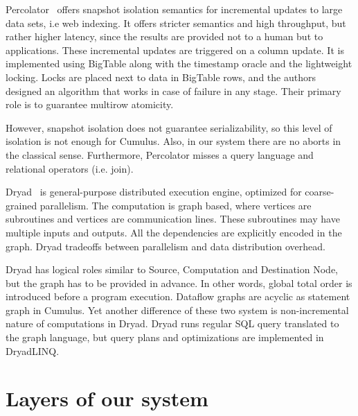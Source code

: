 \documentclass{sig-semester}
\begin{document}
Percolator~\cite{peng10} offers snapshot isolation semantics for incremental updates to large data sets, i.e web indexing. It offers stricter semantics and high throughput, but rather higher latency, since the results are provided not to a human but to applications. These incremental updates are triggered on a column update. It is implemented using BigTable along with the timestamp oracle and the lightweight locking. Locks are placed next to data in BigTable rows, and the authors designed an algorithm that works in case of failure in any stage. Their primary role is to guarantee multirow atomicity.

However, snapshot isolation does not guarantee serializability, so this level of isolation is not enough for Cumulus. Also, in our system there are no aborts in the classical sense. Furthermore, Percolator misses a query language and relational operators (i.e. join).

Dryad~\cite{isard07} is general-purpose distributed execution engine, optimized for coarse-grained parallelism. The computation is graph based, where vertices are subroutines and vertices are communication lines. These subroutines may have multiple inputs and outputs. All the dependencies are explicitly encoded in the graph. Dryad tradeoffs between parallelism and data distribution overhead.

Dryad has logical roles similar to Source, Computation and Destination Node, but the graph has to be provided in advance. In other words, global total order is introduced before a program execution. Dataflow graphs are acyclic as statement graph in Cumulus. Yet another difference of these two system is non-incremental nature of computations in Dryad. Dryad runs regular SQL query translated to the graph language, but query plans and optimizations are implemented in DryadLINQ.

\section{Layers of our system}
\vspace{2mm}
\end{document}

